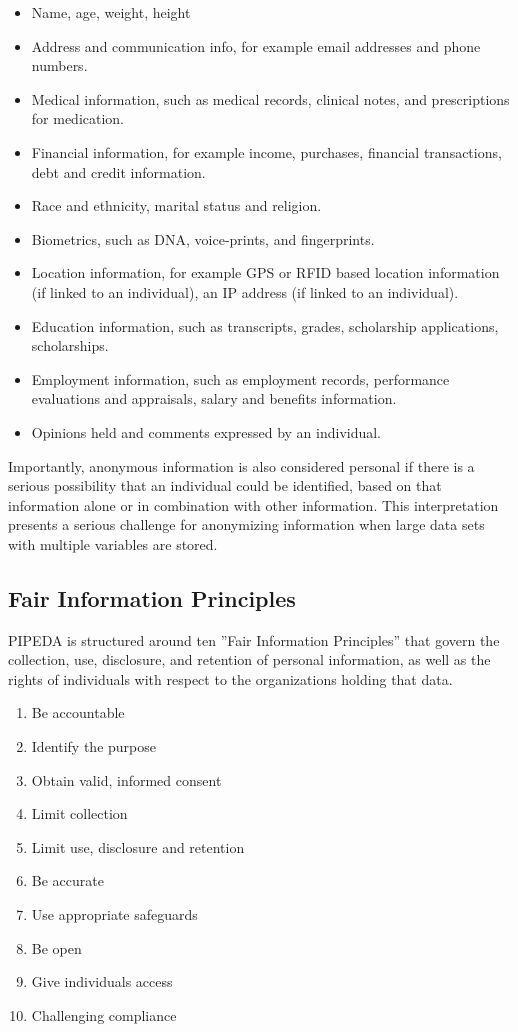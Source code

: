 \begin{itemize}
   \item Name, age, weight, height
   \item Address and communication info, for example email addresses and phone numbers.
   \item Medical information, such as medical records, clinical notes, and prescriptions for medication.
   \item Financial information, for example income, purchases, financial transactions, debt and credit information.
   \item Race and ethnicity, marital status and religion.
   \item Biometrics, such as DNA, voice-prints, and fingerprints.
   \item Location information, for example GPS or RFID based location information (if linked to an individual), an IP address (if linked to an individual).
   \item Education information, such as transcripts, grades, scholarship applications, scholarships.
   \item Employment information, such as employment records, performance evaluations and appraisals, salary and benefits information.
   \item Opinions held and comments expressed by an individual.
\end{itemize} 

Importantly, anonymous information is also considered personal if there is a serious possibility that an individual could be identified, based on that information alone or in combination with other information. This interpretation presents a serious challenge for anonymizing information when large data sets with multiple variables are stored.

\subsection*{Fair Information Principles}

PIPEDA is structured around ten ''Fair Information Principles'' that govern the collection, use, disclosure, and retention of personal information, as well as the rights of individuals with respect to the organizations holding that data. 

\begin{enumerate}
   \item Be accountable
   \item Identify the purpose
   \item Obtain valid, informed consent
   \item Limit collection
   \item Limit use, disclosure and retention
   \item Be accurate
   \item Use appropriate safeguards
   \item Be open
   \item Give individuals access
   \item Challenging compliance
\end{enumerate}

